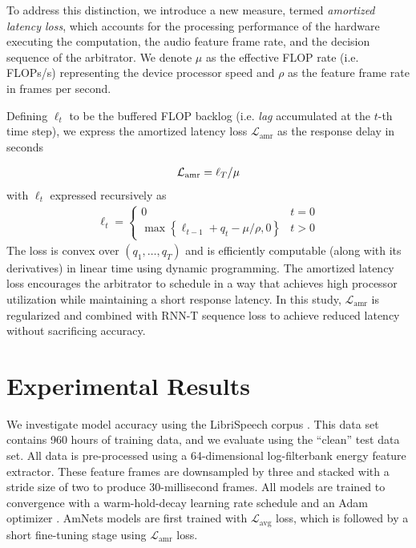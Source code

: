 \documentclass[a4paper]{article}
\newcommand{\computecost}{q}
\newcommand{\bandwidth}{\mu}
\newcommand{\framerate}{\rho}
\begin{document}
To address this distinction, we introduce a new measure, termed \emph{amortized latency loss}, which accounts for the processing performance of the hardware executing the computation, the audio feature frame rate, and the decision sequence of the arbitrator.
We denote $\bandwidth$ as the effective FLOP rate (i.e. FLOPs/s) representing the device processor speed and $\framerate$ as the feature frame rate in frames per second.

Defining $\ell_t$ to be the buffered FLOP backlog (i.e. \emph{lag} accumulated at the $t$-th time step), we express the amortized latency loss $\mathcal{L}_{\text{amr}}$ as the response delay in seconds

\noindent
\begin{align}
	\noindent
	\mathcal{L}_{\text{amr}} = \ell_T/\bandwidth
\end{align}
\noindent
with $\ell_t$ expressed recursively as
\noindent
\begin{align}
\ell_t= \left\{
\begin{array}{ll}
      0 & t = 0 \\
      \max\left\{\ell_{t-1} + \computecost_t - \bandwidth/\framerate, 0\right\} & t > 0
\end{array} 
\right. 
\end{align}
\noindent
The loss is convex over $\left( \computecost_1, \dots, \computecost_T \right)$ and is efficiently computable (along with its derivatives) in linear time using dynamic programming.
The amortized latency loss encourages the arbitrator to schedule in a way that achieves high processor utilization while maintaining a short response latency. In this study, $\mathcal{L}_{\text{amr}}$ is regularized and combined with RNN-T sequence loss to achieve reduced latency without sacrificing accuracy.


\section{Experimental Results}
\label{sec:experiments}
We investigate model accuracy using the LibriSpeech corpus \cite{Panayotov2015}. This data set contains 960 hours of training data, and we evaluate using the ``clean'' test data set. All data is pre-processed using a 64-dimensional log-filterbank energy feature extractor. These feature frames are downsampled by three and stacked with a stride size of two to produce 30-millisecond frames. All models are trained to convergence with a warm-hold-decay learning rate schedule and an Adam optimizer \cite{Kingma2015}. AmNets models are first trained with $\mathcal{L}_{\text{avg}}$ loss, which is followed by a short fine-tuning stage using $\mathcal{L}_{\text{amr}}$ loss.
\end{document}
